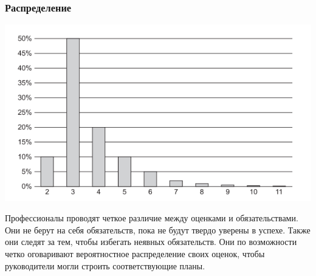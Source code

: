\documentclass{../industrial-development}
\begin{document}
\begin{frame} \frametitle{Распределение}
{\includegraphics[width=1\linewidth]{time-estimate.png}}
\end{frame}
\lecturenotes
Профессионалы проводят четкое различие между оценками и обязательствами. Они не берут на себя обязательств, пока не будут твердо уверены в успехе. Также они следят за тем, чтобы избегать неявных обязательств. Они по возможности четко оговаривают вероятностное распределение своих оценок, чтобы руководители могли строить соответствующие планы.
\end{document}
